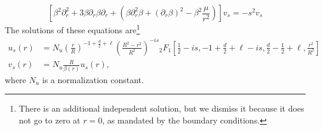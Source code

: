 \documentclass[12pt,a4paper]{article}
\newcommand{\be}{\begin{equation}}
\newcommand{\ee}{\end{equation}}
\def\be{\begin{equation}}
\def\ee{\end{equation}}
\begin{document}
\be
\left[\beta^2\partial_r^2+3\beta\partial_r\beta \partial_r+\left(\beta\partial_r^2\beta+(\partial_r\beta)^2-\beta^2 \frac{\mu}{r^2}\right)\right]v_s=- s^2 v_s
\ee
The solutions of these equations are\footnote{There is an additional independent solution, but we dismiss it because it does not go to zero at $r=0$, as mandated by the boundary conditions.}
\begin{equation}\label{eigenfunctions}
\begin{split}
u_s (r)&=N_u\left(\frac{r}{R}\right)^{-1+\frac{d}{2}+\ell}\left(\frac{R^2-r^2}{R^2}\right)^{-i s}{}_2F_1\left[\frac{1}{2}-i s, -1 + \frac{d}{2} + \ell - i s, \frac{d}{2}-\frac{1}{2} + \ell,\frac{r^2}{R^2}\right]\\
v_s(r)&=N_u\frac{R}{\beta(r)}u_s(r),
\end{split}
\end{equation}
where $N_u$ is a normalization constant.
\end{document}
